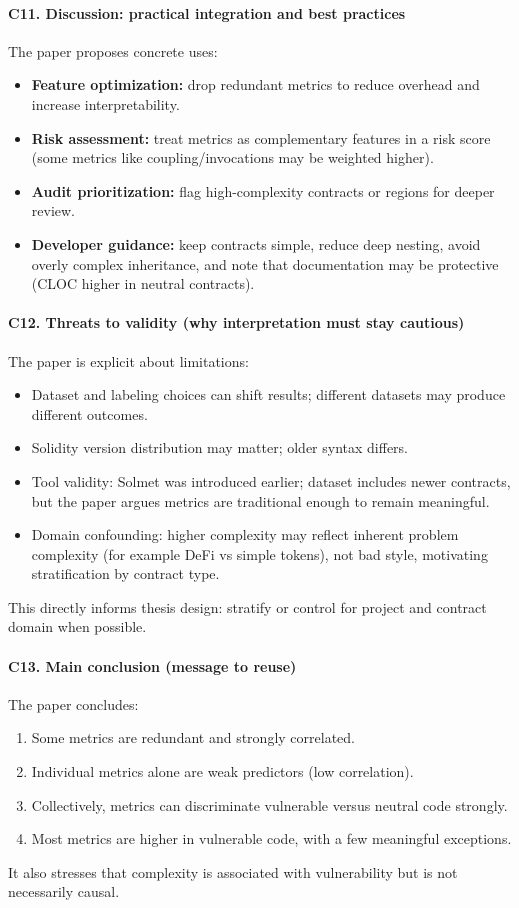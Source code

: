 \documentclass[11pt,a4paper]{article}
\begin{document}
\paragraph{C11. Discussion: practical integration and best practices}
The paper proposes concrete uses:
\begin{itemize}[leftmargin=*]
  \item \textbf{Feature optimization:} drop redundant metrics to reduce overhead and increase interpretability.
  \item \textbf{Risk assessment:} treat metrics as complementary features in a risk score (some metrics like coupling/invocations may be weighted higher).
  \item \textbf{Audit prioritization:} flag high-complexity contracts or regions for deeper review.
  \item \textbf{Developer guidance:} keep contracts simple, reduce deep nesting, avoid overly complex inheritance, and note that documentation may be protective (CLOC higher in neutral contracts).
\end{itemize}

\paragraph{C12. Threats to validity (why interpretation must stay cautious)}
The paper is explicit about limitations:
\begin{itemize}[leftmargin=*]
  \item Dataset and labeling choices can shift results; different datasets may produce different outcomes.
  \item Solidity version distribution may matter; older syntax differs.
  \item Tool validity: Solmet was introduced earlier; dataset includes newer contracts, but the paper argues metrics are traditional enough to remain meaningful.
  \item Domain confounding: higher complexity may reflect inherent problem complexity (for example DeFi vs simple tokens), not bad style, motivating stratification by contract type.
\end{itemize}
This directly informs thesis design: stratify or control for project and contract domain when possible.

\paragraph{C13. Main conclusion (message to reuse)}
The paper concludes:
\begin{enumerate}[leftmargin=*]
  \item Some metrics are redundant and strongly correlated.
  \item Individual metrics alone are weak predictors (low correlation).
  \item Collectively, metrics can discriminate vulnerable versus neutral code strongly.
  \item Most metrics are higher in vulnerable code, with a few meaningful exceptions.
\end{enumerate}
It also stresses that complexity is associated with vulnerability but is not necessarily causal.
\end{document}

